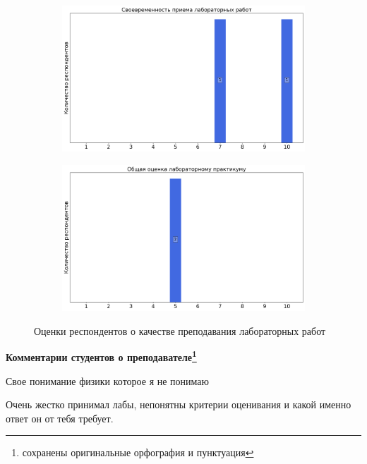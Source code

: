 \begin{figure}[H]
\begin{subfigure}[b]{0.45\textwidth}
				\includegraphics[width=\textwidth]{images/2 course/Общая физика - электричество и магнетизм/labniks-marks-Долгих В.А.-2.png}
			\end{subfigure}
			\begin{subfigure}[b]{0.45\textwidth}
				\centering
				\includegraphics[width=\textwidth]{images/2 course/Общая физика - электричество и магнетизм/labniks-marks-Долгих В.А.-3.png}
			\end{subfigure}	
			\caption{Оценки респондентов о качестве преподавания лабораторных работ}
		\end{figure}

		\textbf{Комментарии студентов о преподавателе\protect\footnote{сохранены оригинальные орфография и пунктуация}}

		\begin{commentbox} 
			Свое понимание физики которое я не понимаю 
		\end{commentbox} 
	   
		\begin{commentbox} 
			Очень жестко принимал лабы, непонятны критерии оценивания и какой именно ответ он от тебя требует. 
		\end{commentbox} 

